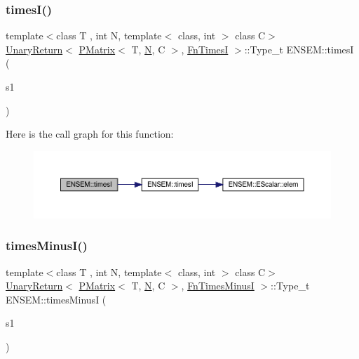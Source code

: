 \subsubsection{\texorpdfstring{timesI()}{timesI()}}
{\footnotesize\ttfamily template$<$class T , int N, template$<$ class, int $>$ class C$>$ \\
\mbox{\hyperlink{structENSEM_1_1UnaryReturn}{Unary\+Return}}$<$ \mbox{\hyperlink{classENSEM_1_1PMatrix}{P\+Matrix}}$<$ T, \mbox{\hyperlink{adat__devel_2lib_2hadron_2operator__name__util_8cc_a7722c8ecbb62d99aee7ce68b1752f337}{N}}, C $>$, \mbox{\hyperlink{structENSEM_1_1FnTimesI}{Fn\+TimesI}} $>$\+::Type\+\_\+t E\+N\+S\+E\+M\+::timesI (\begin{DoxyParamCaption}\item[{const \mbox{\hyperlink{classENSEM_1_1PMatrix}{P\+Matrix}}$<$ T, \mbox{\hyperlink{adat__devel_2lib_2hadron_2operator__name__util_8cc_a7722c8ecbb62d99aee7ce68b1752f337}{N}}, C $>$ \&}]{s1 }\end{DoxyParamCaption})\hspace{0.3cm}{\ttfamily [inline]}}

Here is the call graph for this function\+:\nopagebreak
\begin{figure}[H]
\begin{center}
\leavevmode
\includegraphics[width=350pt]{df/d0a/group__primmatrix_ga9f1d3892badcfa2bf78d97c42c8a05e5_cgraph}
\end{center}
\end{figure}
\mbox{\label{group__primmatrix_ga937a4152dd7d0ceaec303ddbdbaf5a98}} 
\subsubsection{\texorpdfstring{timesMinusI()}{timesMinusI()}}
{\footnotesize\ttfamily template$<$class T , int N, template$<$ class, int $>$ class C$>$ \\
\mbox{\hyperlink{structENSEM_1_1UnaryReturn}{Unary\+Return}}$<$ \mbox{\hyperlink{classENSEM_1_1PMatrix}{P\+Matrix}}$<$ T, \mbox{\hyperlink{adat__devel_2lib_2hadron_2operator__name__util_8cc_a7722c8ecbb62d99aee7ce68b1752f337}{N}}, C $>$, \mbox{\hyperlink{structENSEM_1_1FnTimesMinusI}{Fn\+Times\+MinusI}} $>$\+::Type\+\_\+t E\+N\+S\+E\+M\+::times\+MinusI (\begin{DoxyParamCaption}\item[{const \mbox{\hyperlink{classENSEM_1_1PMatrix}{P\+Matrix}}$<$ T, \mbox{\hyperlink{adat__devel_2lib_2hadron_2operator__name__util_8cc_a7722c8ecbb62d99aee7ce68b1752f337}{N}}, C $>$ \&}]{s1 }\end{DoxyParamCaption})\hspace{0.3cm}{\ttfamily [inline]}}

